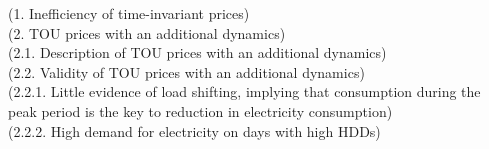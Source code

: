 (1. Inefficiency of time-invariant prices) \\ 

(2. TOU prices with an additional dynamics) \\ 
(2.1. Description of TOU prices with an additional dynamics) \\ 
(2.2. Validity of TOU prices with an additional dynamics) \\ 
(2.2.1. Little evidence of load shifting, implying that consumption during the peak period is the key to reduction in electricity consumption) \\ 
(2.2.2. High demand for electricity on days with high HDDs) \\


